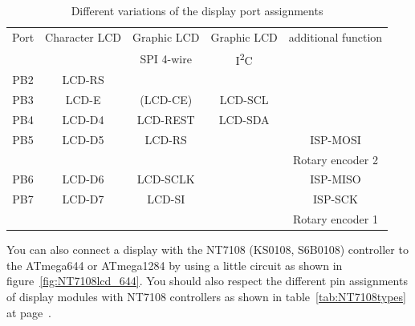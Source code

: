 \begin{table}[H]
  \begin{center}
    \begin{tabular}{| c || c | c | c | c |}
    \hline
      Port & Character LCD &  Graphic LCD  & Graphic LCD  & additional function\\
           &               &  SPI 4-wire   &   I\textsuperscript{2}C        &            \\
    \hline
    \hline
    PB2    &  LCD-RS         &            &             &       \\
    \hline
    PB3    &  LCD-E          &  (LCD-CE)  &  LCD-SCL    &       \\
    \hline
    PB4    &  LCD-D4         &  LCD-REST  &  LCD-SDA    &       \\
    \hline
    PB5    &  LCD-D5         &  LCD-RS    &             & ISP-MOSI \\
           &                 &            &             & Rotary encoder 2 \\
    \hline
    PB6    &  LCD-D6         &  LCD-SCLK  &             & ISP-MISO \\
    \hline
    PB7    &  LCD-D7         &  LCD-SI    &             & ISP-SCK  \\
           &                 &            &             & Rotary encoder 1 \\
    \hline
    \end{tabular}
  \end{center}
  \caption{Different variations of the display port assignments}
  \label{tab:mega644-display}
\end{table}

You can also connect a display with the NT7108 (KS0108, S6B0108) controller to the ATmega644 or ATmega1284 by using
a little circuit as shown in figure~\ref{fig:NT7108lcd_644}.
You should also respect the different pin assignments of display modules with NT7108 controllers as 
shown in table~\ref{tab:NT7108types} at page~\pageref{tab:NT7108types}.

